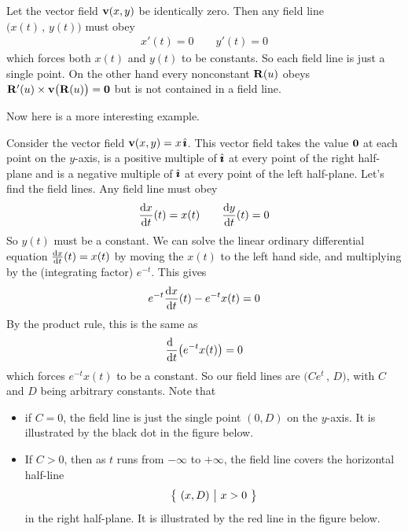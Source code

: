 \begin{eg}\label{ex:badStreamA}
Let the vector field $\mathbf{v}(x,y)$ be identically zero. Then any field line
$\big(x(t)\,,\,y(t)\big)$ must obey
\begin{align*}
x'(t)=0\qquad y'(t)=0
\end{align*}
which forces both $x(t)$ and $y(t)$ to be constants. So each field line is
just a single point. On the other hand every nonconstant
$\mathbf{R}(u)$ obeys $\mathbf{R}'(u)\times\mathbf{v}\big(\mathbf{R}(u)\big)=\mathbf{0}$ but is not 
contained in a field line.
\end{eg}

Now here is a more interesting example.

\begin{eg}\label{ex:badStreamB}
Consider the vector field $\mathbf{v}(x,y)=x\,\hat{\pmb{\imath}}$. This vector field takes the value $\mathbf{0}$ at each point on the $y$-axis, is a positive multiple of $\hat{\pmb{\imath}}$
at every point of the right half-plane and is a negative multiple of 
$\hat{\pmb{\imath}}$ at every point of the left half-plane. Let's find the field lines.
Any field line must obey
\begin{align*}
\diff{x}{t}(t)=x(t)\qquad \diff{y}{t}(t)=0
\end{align*}
So $y(t)$ must be a constant. We can solve the linear ordinary
differential equation $\diff{x}{t}(t)=x(t)$ by moving
the $x(t)$ to the left hand side, and multiplying by the (integrating factor)
$e^{-t}$. This gives
\begin{equation*}
e^{-t}\diff{x}{t}(t)-e^{-t} x(t)=0
\end{equation*}
By the product rule, this is the same as
\begin{equation*}
\diff{\hfill}{t}\big(e^{-t}x(t)\big)=0
\end{equation*}
which forces $e^{-t}x(t)$ to be a constant. So our field lines are
$\big(Ce^t\,,\,D\big)$, with $C$ and $D$ being arbitrary constants.
Note that
\begin{itemize}
\item
if $C=0$, the field line is just the single point $(0,D)$ on the $y$-axis.
It is illustrated by the black dot in the figure below.

\item
If $C>0$, then as $t$ runs from $-\infty$ to $+\infty$, the field line
covers the horizontal half-line
\begin{equation*}
\big\{ \ (x,D)\ \big|\ x>0\ \big\}
\end{equation*}
in the right half-plane.
It is illustrated by the red line in the figure below.



\end{itemize}
\end{eg}
